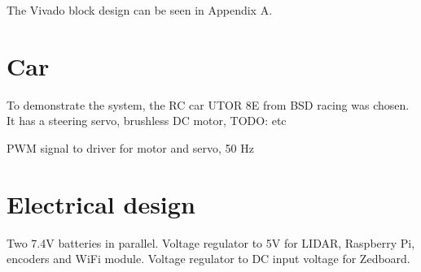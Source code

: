 The Vivado block design can be seen in Appendix A.

\section{Car}
To demonstrate the system, the RC car UTOR 8E from BSD racing was chosen. It has a steering servo, brushless DC motor, TODO: etc

PWM signal to driver for motor and servo, 50 Hz

\section{Electrical design}
Two 7.4V batteries in parallel. Voltage regulator to 5V for LIDAR, Raspberry Pi, encoders and WiFi module. Voltage regulator to DC input voltage for Zedboard.
